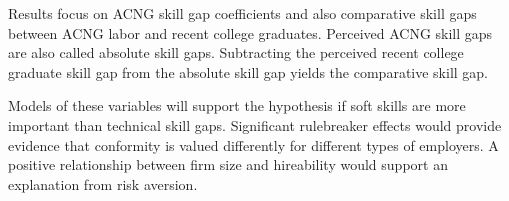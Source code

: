 \documentclass[review]{elsarticle}
\begin{document}
Results focus on ACNG skill gap coefficients
and also comparative skill gaps between ACNG labor and recent college graduates.
Perceived ACNG skill gaps are also called absolute skill gaps.
Subtracting the perceived recent college graduate skill gap from the absolute skill gap yields the comparative skill gap.

Models of these variables will support the hypothesis if soft skills are more important than technical skill gaps.
Significant rulebreaker effects would provide evidence that conformity is valued differently for different types of employers.
A positive relationship between firm size and hireability would support an explanation from risk aversion.



%
\end{document}

